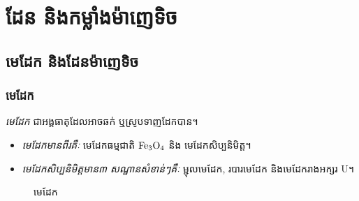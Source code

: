\chapter{ដែន និងកម្លាំងម៉ាញេទិច}
\section{មេដែក និងដែនម៉ាញេទិច}
\subsection{មេដែក}
\begin{definition}
	\begin{minipage}[l]{.6\textwidth}
		\emph{\kml មេដែក} ជាអង្គធាតុដែលអាចឆក់ ឬស្រូបទាញដែកបាន។
		\begin{itemize}
			\item \emph{\kml មេដែកមានពីរគឺៈ} មេដែកធម្មជាតិ $\ce{Fe3O4}$ និង មេដែកសិប្បនិមិត្ត។
			\item \emph{\kml មេដែកសិប្បនិមិត្តមាន៣ សណ្ឋានសំខាន់ៗគឺៈ} ម្ជុលមេដែក, របារមេដែក និងមេដែករាងអក្សរ {\en U}។
		\end{itemize}
	\begin{minipage}[l]{.3\textwidth}
		\begin{figure}[H]
			\centering
		\end{figure}
	\end{minipage}
	\begin{minipage}[c]{.3\textwidth}
		\begin{figure}[H]
			\centering
		\end{figure}
	\end{minipage}
	\begin{minipage}[r]{.3\textwidth}
		\begin{figure}[H]
			\centering
		\end{figure}
	\end{minipage}
	\end{minipage}
	\begin{minipage}[r]{.6\textwidth}
		\begin{figure}[H]
			\centering
			\caption{មេដែក}
		\end{figure}
	\end{minipage}
\end{definition}
